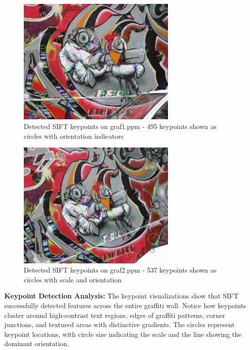 \documentclass[12pt,a4paper]{article}
\begin{document}
\begin{figure}[H]
\centering
\includegraphics[width=0.7\textwidth]{report/figures/graf1_keypoints.jpg}
\caption{Detected SIFT keypoints on graf1.ppm - 495 keypoints shown as circles with orientation indicators}
\label{fig:graf1_keypoints}
\end{figure}

\begin{figure}[H]
\centering
\includegraphics[width=0.7\textwidth]{report/figures/graf2_keypoints.jpg}
\caption{Detected SIFT keypoints on graf2.ppm - 537 keypoints shown as circles with scale and orientation}
\label{fig:graf2_keypoints}
\end{figure}

\textbf{Keypoint Detection Analysis:}
The keypoint visualizations show that SIFT successfully detected features across the entire graffiti wall. Notice how keypoints cluster around high-contrast text regions, edges of graffiti patterns, corner junctions, and textured areas with distinctive gradients. The circles represent keypoint locations, with circle size indicating the scale and the line showing the dominant orientation.
\end{document}
